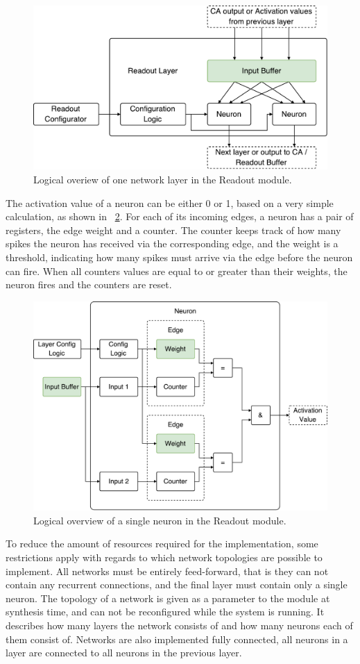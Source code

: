 \begin{figure}[ht]
  \centering
  \includegraphics[width=0.8\linewidth]{fig/readout-layer}
  \caption{Logical overiew of one network layer in the Readout module.}
  \label{fig:readout-layer}
\end{figure}

The activation value of a neuron can be either 0 or 1, based on a very simple
calculation, as shown in \figurename~\ref{fig:readout-neuron}. For each of its
incoming edges, a neuron has a pair of registers, the edge weight and a counter.
The counter keeps track of how many spikes the neuron has received via the
corresponding edge, and the weight is a threshold, indicating how many spikes
must arrive via the edge before the neuron can fire. When all counters values
are equal to or greater than their weights, the neuron fires and the counters
are reset.

\begin{figure}[ht]
  \centering
  \includegraphics[width=0.8\linewidth]{fig/readout-neuron}
  \caption{Logical overview of a single neuron in the Readout module.}
  \label{fig:readout-neuron}
\end{figure}

To reduce the amount of resources required for the implementation, some
restrictions apply with regards to which network topologies are possible to
implement. All networks must be entirely feed-forward, that is they can not
contain any recurrent connections, and the final layer must contain only a
single neuron. The topology of a network is given as a parameter to the module
at synthesis time, and can not be reconfigured while the system is running. It
describes how many layers the network consists of and how many neurons each of
them consist of. Networks are also implemented fully connected, all neurons in a
layer are connected to all neurons in the previous layer.


